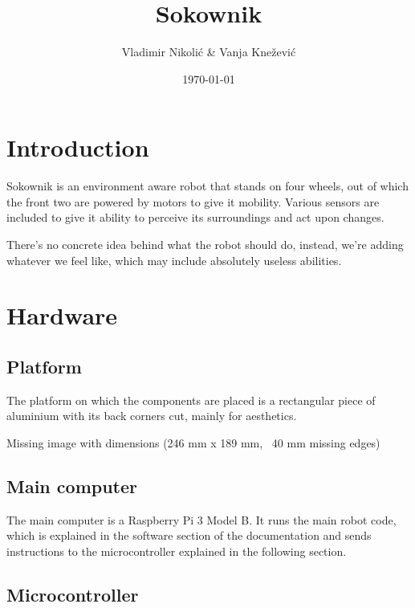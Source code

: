 \documentclass[11pt, a4paper]{article}
\title{\myfont Sokownik}
\author{Vladimir Nikolić \& Vanja Knežević}
\date{\today}
\begin{document}
    \maketitle
    \newpage

    \tableofcontents
    \newpage


    \section{Introduction}
    
    Sokownik is an environment aware robot that stands on four wheels, out of which the front two are powered by motors to give it mobility. Various sensors are included to give it ability to perceive its surroundings and act upon changes.
    
    There's no concrete idea behind what the robot should do, instead, we're adding whatever we feel like, which may include absolutely useless abilities.

    \section{Hardware}
    
    \subsection{Platform}    
    
    The platform on which the components are placed is a rectangular piece of aluminium with its back corners cut, mainly for aesthetics.

    Missing image with dimensions (246 mm x 189 mm, ~40 mm missing edges)
    
    \subsection{Main computer}
    
    The main computer is a Raspberry Pi 3 Model B. It runs the main robot code, which is explained in the software section of the documentation and sends instructions to the microcontroller explained in the following section.
    
    \subsection{Microcontroller}
    
\end{document}
